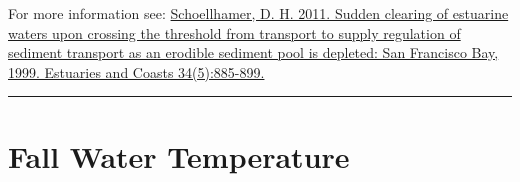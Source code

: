 \documentclass[
]{book}
\begin{document}
\begin{disclaimer}
For more information see:
\href{https://link.springer.com/article/10.1007/s12237-011-9382-x}{Schoellhamer,
D. H. 2011. Sudden clearing of estuarine waters upon crossing the
threshold from transport to supply regulation of sediment transport as
an erodible sediment pool is depleted: San Francisco Bay, 1999.
Estuaries and Coasts 34(5):885-899.}
\end{disclaimer}

\begin{center}\rule{0.5\linewidth}{0.5pt}\end{center}

\hypertarget{fall-water-temperature}{%
\section{Fall Water Temperature}\label{fall-water-temperature}}
\end{document}
